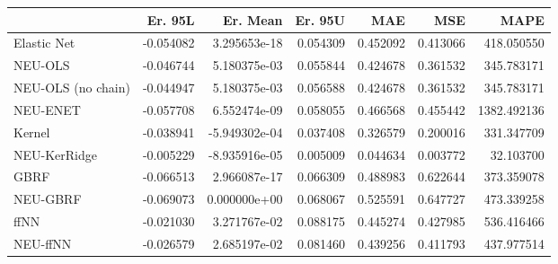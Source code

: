 \begin{tabular}{lrrrrrr}
\toprule
{} &   Er. 95L &      Er. Mean &   Er. 95U &       MAE &       MSE &         MAPE \\
\midrule
Elastic Net        & -0.054082 &  3.295653e-18 &  0.054309 &  0.452092 &  0.413066 &   418.050550 \\
NEU-OLS            & -0.046744 &  5.180375e-03 &  0.055844 &  0.424678 &  0.361532 &   345.783171 \\
NEU-OLS (no chain) & -0.044947 &  5.180375e-03 &  0.056588 &  0.424678 &  0.361532 &   345.783171 \\
NEU-ENET           & -0.057708 &  6.552474e-09 &  0.058055 &  0.466568 &  0.455442 &  1382.492136 \\
Kernel             & -0.038941 & -5.949302e-04 &  0.037408 &  0.326579 &  0.200016 &   331.347709 \\
NEU-KerRidge       & -0.005229 & -8.935916e-05 &  0.005009 &  0.044634 &  0.003772 &    32.103700 \\
GBRF               & -0.066513 &  2.966087e-17 &  0.066309 &  0.488983 &  0.622644 &   373.359078 \\
NEU-GBRF           & -0.069073 &  0.000000e+00 &  0.068067 &  0.525591 &  0.647727 &   473.339258 \\
ffNN               & -0.021030 &  3.271767e-02 &  0.088175 &  0.445274 &  0.427985 &   536.416466 \\
NEU-ffNN           & -0.026579 &  2.685197e-02 &  0.081460 &  0.439256 &  0.411793 &   437.977514 \\
\bottomrule
\end{tabular}
